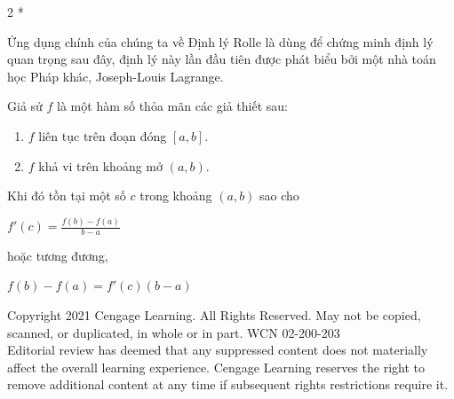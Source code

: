 \begin{paracol}{2}
\switchcolumn[1]*

\vspace{6pt}
\noindent{\color{stewartblue}\rule{1.2ex}{1.2ex}}

\smallskip
\noindent Ứng dụng chính của chúng ta về Định lý Rolle là dùng để chứng minh định lý quan trọng sau đây, định lý này lần đầu tiên được phát biểu bởi một nhà toán học Pháp khác, Joseph-Louis Lagrange.

\smallskip
\begin{tcolorbox}[
  enhanced,
  colback=white,
  colframe=boxred,
  arc=0mm,
  boxrule=0.8pt,
  left=8pt, right=8pt, top=6pt, bottom=6pt
]
  \quad
  Giả sử $f$ là một hàm số thỏa mãn các giả thiết sau:
  \begin{enumerate}[label=\textbf{\arabic*.}, leftmargin=1.8em, itemsep=1pt, topsep=3pt, parsep=0pt]
    \item $f$ liên tục trên đoạn đóng $[a, b]$.
    \item $f$ khả vi trên khoảng mở $(a, b)$.
  \end{enumerate}
  Khi đó tồn tại một số $c$ trong khoảng $(a, b)$ sao cho
  \vspace{4pt}

  \noindent{}\hfill $\displaystyle f'(c) = \frac{f(b) - f(a)}{b - a}$\hfill{}

  \vspace{4pt}
  \noindent hoặc tương đương,
  \vspace{4pt}

  \noindent{}\hfill $\displaystyle f(b) - f(a) = f'(c)(b - a)$\hfill{}
\end{tcolorbox}

\switchcolumn[0]
\vspace{44pt}

\end{paracol}

\vfill
\begin{center}
{\fontsize{5.5}{7}\selectfont\color{gray!80!black}
Copyright 2021 Cengage Learning. All Rights Reserved. May not be copied, scanned, or duplicated, in whole or in part. WCN 02-200-203\\[1pt]
Editorial review has deemed that any suppressed content does not materially affect the overall learning experience. Cengage Learning reserves the right to remove additional content at any time if subsequent rights restrictions require it.
}
\end{center}
